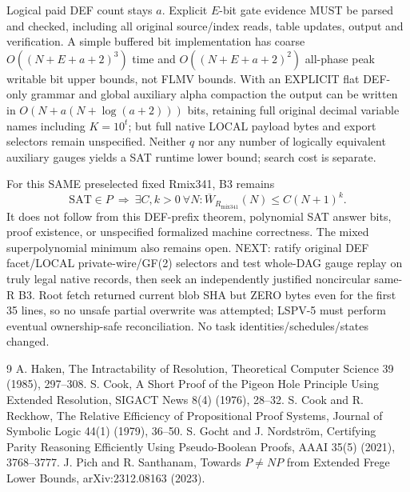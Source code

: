\documentclass[11pt]{article}
\begin{document}
Logical paid DEF count stays $a$. Explicit $E$-bit gate evidence MUST be parsed and checked, including all original source/index reads, table updates, output and verification. A simple buffered bit implementation has coarse $O((N+E+a+2)^3)$ time and $O((N+E+a+2)^2)$ all-phase peak writable bit upper bounds, not FLMV bounds. With an EXPLICIT flat DEF-only grammar and global auxiliary alpha compaction the output can be written in $O(N+a(N+\log(a+2)))$ bits, retaining full original decimal variable names including $K=10^t$; but full native LOCAL payload bytes and export selectors remain unspecified. Neither $q$ nor any number of logically equivalent auxiliary gauges yields a SAT runtime lower bound; search cost is separate.

For this SAME preselected fixed Rmix341, B3 remains
\[
\mathrm{SAT}\in P\ \Longrightarrow\ \exists C,k>0\ \forall N:
\overline W_{R_{\mathrm{mix341}}}(N)\le C(N+1)^k.
\]
It does not follow from this DEF-prefix theorem, polynomial SAT answer bits, proof existence, or unspecified formalized machine correctness. The mixed superpolynomial minimum also remains open. NEXT: ratify original DEF facet/LOCAL private-wire/GF(2) selectors and test whole-DAG gauge replay on truly legal native records, then seek an independently justified noncircular same-R B3. Root  fetch returned current blob SHA but ZERO bytes even for the first 35 lines, so no unsafe partial overwrite was attempted; LSPV-5 must perform eventual ownership-safe reconciliation. No task identities/schedules/states changed.

\begin{thebibliography}{9}
 A. Haken, The Intractability of Resolution, Theoretical Computer Science 39 (1985), 297--308.
 S. Cook, A Short Proof of the Pigeon Hole Principle Using Extended Resolution, SIGACT News 8(4) (1976), 28--32.
 S. Cook and R. Reckhow, The Relative Efficiency of Propositional Proof Systems, Journal of Symbolic Logic 44(1) (1979), 36--50.
 S. Gocht and J. Nordstr\"om, Certifying Parity Reasoning Efficiently Using Pseudo-Boolean Proofs, AAAI 35(5) (2021), 3768--3777.
 J. Pich and R. Santhanam, Towards $P\ne NP$ from Extended Frege Lower Bounds, arXiv:2312.08163 (2023).
\end{thebibliography}
\end{document}
